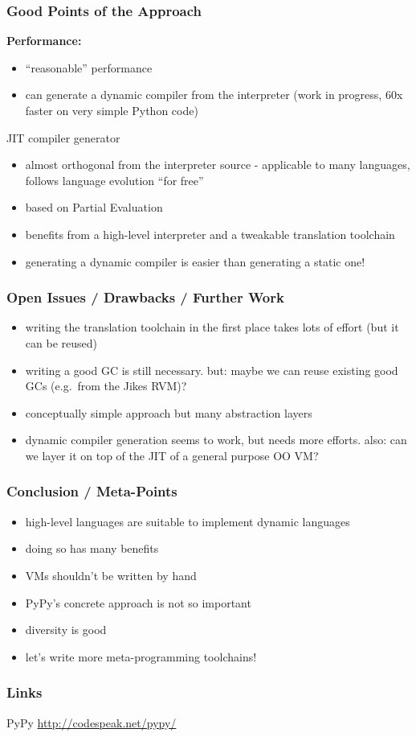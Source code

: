 \documentclass[utf8x]{beamer}
\begin{document}
\begin{frame}
  \frametitle{Good Points of the Approach}
  {\bf Performance:}

  \begin{itemize}
  \item
    ``reasonable'' performance
  \item
    can generate a dynamic compiler from the interpreter
    (work in progress, 60x faster on very simple Python code)
  \end{itemize}
  \pause
  \begin{block}{
    JIT compiler generator}
    \begin{itemize}
    \item
      almost orthogonal from the interpreter source - applicable to many
      languages, follows language evolution ``for free''
    \item
      based on Partial Evaluation
    \item
      benefits from a high-level interpreter and a tweakable translation
      toolchain
    \item
      generating a dynamic compiler is easier than generating a static one!
    \end{itemize}
  \end{block}
\end{frame}

\begin{frame}
  \frametitle{Open Issues / Drawbacks / Further Work}
  \begin{itemize}
  \item
    writing the translation toolchain in the first place takes lots of effort
    (but it can be reused)
  \item
    writing a good GC is still necessary. but: maybe we can reuse existing good
    GCs (e.g.\ from the Jikes RVM)?
  \item
    conceptually simple approach but many abstraction layers
  \item
    dynamic compiler generation seems to work, but needs more efforts.
    also: can we layer it on top of the JIT of a general purpose OO VM?
  \end{itemize}
\end{frame}

\begin{frame}
  \frametitle{Conclusion / Meta-Points}
  \begin{itemize}
  \item
    high-level languages are suitable to implement dynamic languages
  \item
    doing so has many benefits
  \item
    VMs shouldn't be written by hand
  \item
    PyPy's concrete approach is not so important
  \item
    diversity is good
  \item
    let's write more meta-programming toolchains!
  \end{itemize}
\end{frame}

\begin{frame}
  \frametitle{Links}
  \begin{block}{
    PyPy}
    \bigskip
    \hskip 1cm \url{http://codespeak.net/pypy/}
    \bigskip
  \end{block}
\end{frame}
\end{document}
